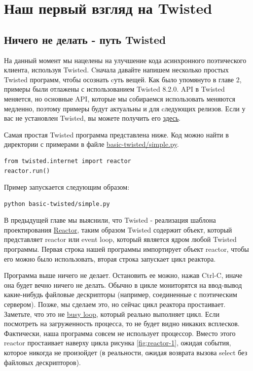 

\section{Наш первый взгляд на Twisted\label{sec:part3}}

\subsection{Ничего не делать - путь Twisted}

На данный момент мы нацелены на улучшение кода  
асинхронного поэтического клиента,  
используя Twisted. Cначала давайте напишем 
несколько простых Twisted программ,  
чтобы осознать cуть вещей. Как было упомянуто в главе 2,  
примеры были отлажены с использованием Twisted 8.2.0. API 
в Twisted меняется, но основные API, которые мы собираемся использовать 
меняются медленно, поэтому примеры 
будут актуальны и для cледующих релизов. Если у вас не 
установлен Twisted, вы можете получить его 
\href{http://twistedmatrix.com/trac/wiki/Downloads}{здесь}.


Самая простая Twisted программа представлена ниже. Код можно 
найти в директории с примерами в файле    
\href{http://github.com/jdavisp3/twisted-intro/blob/master/basic-twisted/simple.py}{basic-twisted/simple.py}. 

\begin{scriptsize}\begin{verbatim}
from twisted.internet import reactor
reactor.run()
\end{verbatim}\end{scriptsize}

Пример запускается следующим образом:

\begin{scriptsize}\begin{verbatim}
python basic-twisted/simple.py
\end{verbatim}\end{scriptsize}

В предыдущей главе мы выяснили, что Twisted - реализация шаблона проектирования 
\href{http://en.wikipedia.org/wiki/Reactor\_pattern}{Reactor}, 
таким образом Twisted содержит объект, который представляет reactor или 
event loop, который является ядром любой Twisted программы. Первая строка 
нашей программы импортирует объект reactor, чтобы его можно было   
использовать, вторая строка запускает цикл реактора. 


Программа выше ничего не делает. Остановить ее можно, 
нажав Ctrl-C, иначе она будет вечно ничего не делать. 
Обычно в цикле мониторятся на ввод-вывод какие-нибудь 
файловые дескрипторы (например, соединенные с поэтическим 
сервером). Позже, мы сделаем это, но сейчас 
цикл реактора простаивает. Заметьте, что это не 
\href{http://en.wikipedia.org/wiki/Busy\_waiting}{busy loop}, 
который реально выполняет цикл. Если посмотреть 
на загруженность процесса, то не будет видно никаких 
всплесков. Фактически, наша программа совсем не использует 
процессор. Вместо этого reactor простаивает наверху 
цикла рисунка \ref{fig:reactor-1}, ожидая события, которое 
никогда не произойдет (в реальности, ожидая возврата 
вызова select без файловых дескрипторов).


